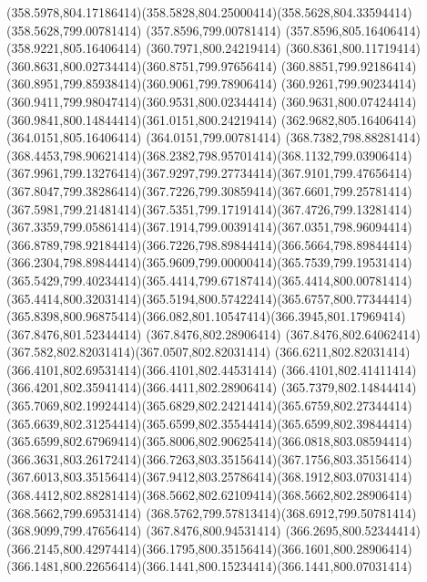 {{	\curveto(358.5978,804.17186414)(358.5828,804.25000414)(358.5628,804.33594414)
	\lineto(358.5628,799.00781414)
	\lineto(357.8596,799.00781414)
	\lineto(357.8596,805.16406414)
	\lineto(358.9221,805.16406414)
	\lineto(360.7971,800.24219414)
	\curveto(360.8361,800.11719414)(360.8631,800.02734414)(360.8751,799.97656414)
	\curveto(360.8851,799.92186414)(360.8951,799.85938414)(360.9061,799.78906414)
	\curveto(360.9261,799.90234414)(360.9411,799.98047414)(360.9531,800.02344414)
	\curveto(360.9631,800.07424414)(360.9841,800.14844414)(361.0151,800.24219414)
	\lineto(362.9682,805.16406414)
	\lineto(364.0151,805.16406414)
	\lineto(364.0151,799.00781414)
	\closepath
	\moveto(368.7382,798.88281414)
	\curveto(368.4453,798.90621414)(368.2382,798.95701414)(368.1132,799.03906414)
	\curveto(367.9961,799.13276414)(367.9297,799.27734414)(367.9101,799.47656414)
	\curveto(367.8047,799.38286414)(367.7226,799.30859414)(367.6601,799.25781414)
	\curveto(367.5981,799.21481414)(367.5351,799.17191414)(367.4726,799.13281414)
	\curveto(367.3359,799.05861414)(367.1914,799.00391414)(367.0351,798.96094414)
	\curveto(366.8789,798.92184414)(366.7226,798.89844414)(366.5664,798.89844414)
	\curveto(366.2304,798.89844414)(365.9609,799.00000414)(365.7539,799.19531414)
	\curveto(365.5429,799.40234414)(365.4414,799.67187414)(365.4414,800.00781414)
	\curveto(365.4414,800.32031414)(365.5194,800.57422414)(365.6757,800.77344414)
	\curveto(365.8398,800.96875414)(366.082,801.10547414)(366.3945,801.17969414)
	\lineto(367.8476,801.52344414)
	\lineto(367.8476,802.28906414)
	\curveto(367.8476,802.64062414)(367.582,802.82031414)(367.0507,802.82031414)
	\curveto(366.6211,802.82031414)(366.4101,802.69531414)(366.4101,802.44531414)
	\curveto(366.4101,802.41411414)(366.4201,802.35941414)(366.4411,802.28906414)
	\lineto(365.7379,802.14844414)
	\curveto(365.7069,802.19924414)(365.6829,802.24214414)(365.6759,802.27344414)
	\curveto(365.6639,802.31254414)(365.6599,802.35544414)(365.6599,802.39844414)
	\curveto(365.6599,802.67969414)(365.8006,802.90625414)(366.0818,803.08594414)
	\curveto(366.3631,803.26172414)(366.7263,803.35156414)(367.1756,803.35156414)
	\curveto(367.6013,803.35156414)(367.9412,803.25786414)(368.1912,803.07031414)
	\curveto(368.4412,802.88281414)(368.5662,802.62109414)(368.5662,802.28906414)
	\lineto(368.5662,799.69531414)
	\curveto(368.5762,799.57813414)(368.6912,799.50781414)(368.9099,799.47656414)
	\closepath
	\moveto(367.8476,800.94531414)
	\lineto(366.2695,800.52344414)
	\curveto(366.2145,800.42974414)(366.1795,800.35156414)(366.1601,800.28906414)
	\curveto(366.1481,800.22656414)(366.1441,800.15234414)(366.1441,800.07031414)
}}
